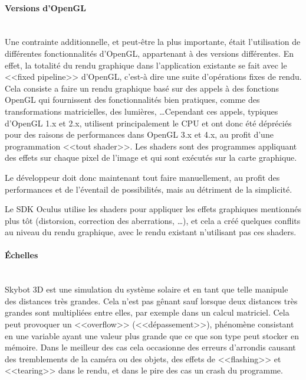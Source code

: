 \documentclass[a4paper,french,12pt]{article}
\begin{document}
	    \paragraph{Versions d'OpenGL} ~\\

		Une contrainte additionnelle, et peut-être la plus importante, était l'utilisation de différentes
		fonctionnalités d'OpenGL, appartenant à des versions différentes.
		En effet, la totalité du rendu graphique dans l'application existante se fait avec le <<fixed pipeline>>
		d'OpenGL, c'est-à dire une suite d'opérations fixes de rendu. Cela consiste a faire un rendu graphique basé sur des
		appels à des fonctions OpenGL qui fournissent des fonctionnalités bien pratiques, comme des transformations
		matricielles, des lumières, \ldots Cependant ces appels, typiques d'OpenGL 1.x et 2.x,
		utilisent principalement le CPU et ont donc
		été dépréciés pour des raisons de performances dans OpenGL 3.x et 4.x, au profit d'une programmation
		<<tout shader>>. Les shaders sont des programmes appliquant des effets sur chaque pixel de l'image et qui
		sont exécutés sur la carte graphique.

		Le développeur doit donc maintenant tout faire manuellement, au profit des performances et de l'éventail
		de possibilités, mais au détriment de la simplicité.

		Le SDK Oculus utilise les shaders pour appliquer les effets graphiques mentionnés plus tôt (distorsion,
		correction des aberrations, \ldots), et cela a créé quelques conflits au niveau du rendu graphique,
		avec le rendu existant n'utilisant pas ces shaders.

	    \paragraph{Échelles} ~\\
	      Skybot 3D est une simulation du système solaire et en tant que telle manipule des distances très grandes.
	      Cela n'est pas gênant sauf lorsque deux distances très grandes sont multipliées entre elles, par exemple
	      dans un calcul matriciel.
	      Cela peut provoquer un <<overflow>> (<<dépassement>>), phénomène consistant en une variable ayant une valeur
	      plus grande que ce que son type peut stocker en mémoire. Dans le meilleur des cas cela occasionne des
	      erreurs d'arrondis causant des tremblements de la caméra ou des objets, des effets de <<flashing>> et
	      <<tearing>> dans le rendu, et dans le pire des cas un crash du programme.
\end{document}
